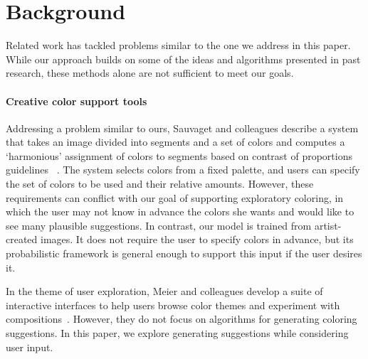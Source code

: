 \section{Background}
\label{sec:background}

Related work has tackled problems similar to the one we address in this paper. While our approach builds on some of the ideas and algorithms presented in past research, these methods alone are not sufficient to meet our goals.

\paragraph{Creative color support tools}
Addressing a problem similar to ours, Sauvaget and colleagues describe a system that takes an image divided into segments and a set of colors and computes a `harmonious' assignment of colors to segments based on contrast of proportions guidelines ~. The system selects colors from a fixed palette, and users can specify the set of colors to be used and their relative amounts. However, these requirements can conflict with our goal of supporting exploratory coloring, in which the user may not know in advance the colors she wants and would like to see many plausible suggestions. In contrast, our model is trained from artist-created images. It does not require the user to specify colors in advance, but its probabilistic framework is general enough to support this input if the user desires it.

In the theme of user exploration, Meier and colleagues develop a suite of interactive interfaces to help users browse color themes and experiment with compositions~. However, they do not focus on algorithms for generating coloring suggestions. In this paper, we explore generating suggestions while considering user input.

